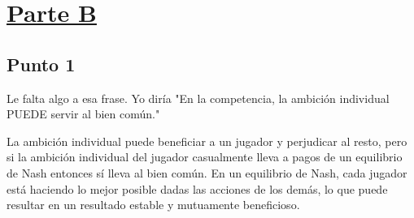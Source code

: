 \documentclass{article}
\begin{document}
    \section*{\underline{Parte B}}
        \subsection*{Punto 1}
            Le falta algo a esa frase. Yo diría "En la competencia, la ambición individual PUEDE servir al bien común."

            La ambición individual puede beneficiar a un jugador y perjudicar al resto, pero si la ambición individual del jugador casualmente lleva a pagos de un equilibrio de Nash entonces sí lleva al bien común. En un equilibrio de Nash, cada jugador está haciendo lo mejor posible dadas las acciones de los demás, lo que puede resultar en un resultado estable y mutuamente beneficioso.
\end{document}
